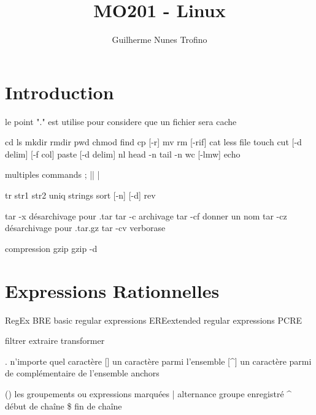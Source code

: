 \documentclass{article}
\title{MO201 - Linux}
\author{Guilherme Nunes Trofino}
\begin{document}
\maketitle

\newpage\tableofcontents

\section{Introduction}
le point "." est utilise pour considere que un fichier sera cache

cd
ls
mkdir
rmdir
pwd
chmod
find
cp [-r]
mv
rm [-rif]
cat
less
file
touch
cut [-d delim] [-f col]
paste [-d delim]
nl
head -n
tail -n
wc [-lmw]
echo

multiples commands
;
||
|


tr str1 str2
uniq
strings
sort [-n] [-d]
rev


tar -x désarchivage pour .tar
tar -c archivage
tar -cf donner un nom
tar -cz désarchivage pour .tar.gz
tar -cv verborase

compression
gzip
gzip -d


\section{Expressions Rationnelles}
RegEx
    BRE basic regular expressions
    EREextended regular expressions
    PCRE

filtrer
extraire
transformer

. n'importe quel caractère
[] un caractère parmi l'ensemble
[^] un caractère parmi de complémentaire de l'ensemble
anchors

() les groupements ou expressions marquées
| alternance
\1 groupe enregistré
^ début de chaîne
\$ fin de chaîne
\end{document}
